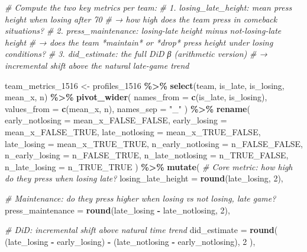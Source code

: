 \documentclass[
]{article}
\newenvironment{Shaded}{\begin{snugshade}}{\end{snugshade}}
\newcommand{\AttributeTok}[1]{\textcolor[rgb]{0.13,0.29,0.53}{#1}}
\newcommand{\CommentTok}[1]{\textcolor[rgb]{0.56,0.35,0.01}{\textit{#1}}}
\newcommand{\DecValTok}[1]{\textcolor[rgb]{0.00,0.00,0.81}{#1}}
\newcommand{\FunctionTok}[1]{\textcolor[rgb]{0.13,0.29,0.53}{\textbf{#1}}}
\newcommand{\NormalTok}[1]{#1}
\newcommand{\OtherTok}[1]{\textcolor[rgb]{0.56,0.35,0.01}{#1}}
\newcommand{\SpecialCharTok}[1]{\textcolor[rgb]{0.81,0.36,0.00}{\textbf{#1}}}
\newcommand{\StringTok}[1]{\textcolor[rgb]{0.31,0.60,0.02}{#1}}
\begin{document}
\begin{Shaded}
\begin{Highlighting}[]
\CommentTok{\# Compute the two key metrics per team:}
\CommentTok{\#   1. losing\_late\_height:   mean press height when losing after 70\textquotesingle{}}
\CommentTok{\#      → how high does the team press in comeback situations?}
\CommentTok{\#   2. press\_maintenance:    losing{-}late height minus not{-}losing{-}late height}
\CommentTok{\#      → does the team *maintain* or *drop* press height under losing conditions?}
\CommentTok{\#   3. did\_estimate:         the full DiD β (arithmetic version)}
\CommentTok{\#      → incremental shift above the natural late{-}game trend}

\NormalTok{team\_metrics\_1516 }\OtherTok{\textless{}{-}}\NormalTok{ profiles\_1516 }\SpecialCharTok{\%\textgreater{}\%}
  \FunctionTok{select}\NormalTok{(team, is\_late, is\_losing, mean\_x, n) }\SpecialCharTok{\%\textgreater{}\%}
  \FunctionTok{pivot\_wider}\NormalTok{(}
    \AttributeTok{names\_from  =} \FunctionTok{c}\NormalTok{(is\_late, is\_losing),}
    \AttributeTok{values\_from =} \FunctionTok{c}\NormalTok{(mean\_x, n),}
    \AttributeTok{names\_sep   =} \StringTok{"\_"}
\NormalTok{  ) }\SpecialCharTok{\%\textgreater{}\%}
  \FunctionTok{rename}\NormalTok{(}
    \AttributeTok{early\_notlosing =}\NormalTok{ mean\_x\_FALSE\_FALSE,}
    \AttributeTok{early\_losing    =}\NormalTok{ mean\_x\_FALSE\_TRUE,}
    \AttributeTok{late\_notlosing  =}\NormalTok{ mean\_x\_TRUE\_FALSE,}
    \AttributeTok{late\_losing     =}\NormalTok{ mean\_x\_TRUE\_TRUE,}
    \AttributeTok{n\_early\_notlosing =}\NormalTok{ n\_FALSE\_FALSE,}
    \AttributeTok{n\_early\_losing    =}\NormalTok{ n\_FALSE\_TRUE,}
    \AttributeTok{n\_late\_notlosing  =}\NormalTok{ n\_TRUE\_FALSE,}
    \AttributeTok{n\_late\_losing     =}\NormalTok{ n\_TRUE\_TRUE}
\NormalTok{  ) }\SpecialCharTok{\%\textgreater{}\%}
  \FunctionTok{mutate}\NormalTok{(}
    \CommentTok{\# Core metric: how high do they press when losing late?}
    \AttributeTok{losing\_late\_height =} \FunctionTok{round}\NormalTok{(late\_losing, }\DecValTok{2}\NormalTok{),}
    
    \CommentTok{\# Maintenance: do they press higher when losing vs not losing, late game?}
    \AttributeTok{press\_maintenance  =} \FunctionTok{round}\NormalTok{(late\_losing }\SpecialCharTok{{-}}\NormalTok{ late\_notlosing, }\DecValTok{2}\NormalTok{),}
    
    \CommentTok{\# DiD: incremental shift above natural time trend}
    \AttributeTok{did\_estimate =} \FunctionTok{round}\NormalTok{(}
\NormalTok{      (late\_losing }\SpecialCharTok{{-}}\NormalTok{ early\_losing) }\SpecialCharTok{{-}}\NormalTok{ (late\_notlosing }\SpecialCharTok{{-}}\NormalTok{ early\_notlosing), }\DecValTok{2}
\NormalTok{    ),}
    

\end{Highlighting}
\end{Shaded}
\end{document}
